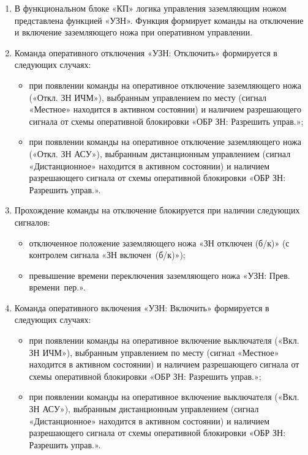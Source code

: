 \begin{enumerate}
\begin{enumerate}
\item 
В функциональном блоке «КП» логика управления заземляющим ножом представлена функцией «УЗН». Функция формирует команды на отключение и включение заземляющего ножа при оперативном управлении.

\item
Команда оперативного отключения «УЗН: Отключить» формируется в следующих случаях:
\begin{itemize}
	\item при появлении команды на оперативное отключение заземляющего ножа («Откл. ЗН ИЧМ»), выбранным управлением по месту (сигнал «Местное» находится в активном состоянии) и наличием разрешающего сигнала от схемы оперативной блокировки «ОБР ЗН: Разрешить управ.»;
	\item при появлении команды на оперативное отключение заземляющего ножа («Откл. ЗН АСУ»), выбранным дистанционным управлением (сигнал «Дистанционное» находится в активном состоянии) и наличием разрешающего сигнала от схемы оперативной блокировки «ОБР ЗН: Разрешить управ.».
\end{itemize}

\item
Прохождение команды на отключение блокируется при наличии следующих сигналов:
\begin{itemize}
	\item отключенное положение заземляющего ножа «ЗН отключен (б/к)» (с контролем сигнала «ЗН включен~(б/к)»);
	\item превышение времени переключения заземляющего ножа «УЗН: Прев. времени~пер.».
\end{itemize}

\item
Команда оперативного включения «УЗН: Включить» формируется в следующих случаях:
\begin{itemize}
	\item при появлении команды на оперативное включение выключателя («Вкл. ЗН ИЧМ»), выбранным управлением по месту (сигнал «Местное» находится в активном состоянии) и наличием разрешающего сигнала от схемы оперативной блокировки «ОБР ЗН: Разрешить управ.»;
	\item при появлении команды на оперативное включение выключателя («Вкл. ЗН АСУ»), выбранным дистанционным управлением (сигнал «Дистанционное» находится в активном состоянии) и наличием разрешающего сигнала от схемы оперативной блокировки «ОБР ЗН: Разрешить управ.».
\end{itemize}


\end{enumerate}
\end{enumerate}
